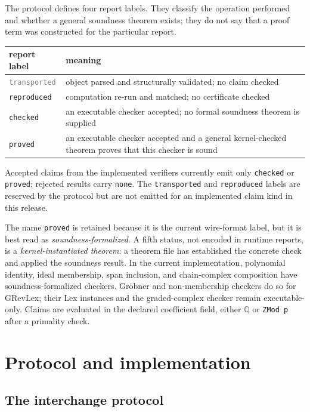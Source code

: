 \documentclass[11pt]{article}
\newcommand{\proved}{\textcolor{okgreen}{\code{proved}}}
\newcommand{\checked}{\textcolor{warnamber}{\code{checked}}}
\newcommand{\QQ}{\mathbb{Q}}
\newcommand{\code}[1]{\texttt{#1}}
\begin{document}
The protocol defines four report labels.  They classify the operation
performed and whether a general soundness theorem exists; they do not
say that a proof term was constructed for the particular report.

\begin{center}
\begin{tabular}{lp{}}
\toprule
report label & meaning \\
\midrule
\textcolor{gray}{\code{transported}} & object parsed and structurally validated; no claim checked \\
\textcolor{gray!30!black}{\code{reproduced}} & computation re-run and matched; no certificate checked \\
\checked{} & an executable checker accepted; no formal soundness theorem is supplied \\
\proved{} & an executable checker accepted and a general kernel-checked theorem proves that this checker is sound \\
\bottomrule
\end{tabular}
\end{center}

Accepted claims from the implemented verifiers currently emit only
\checked{} or \proved{}; rejected results carry \code{none}.  The
\code{transported} and \code{reproduced} labels are
reserved by the protocol but are not emitted for an implemented claim
kind in this release.

The name \code{proved} is retained because it is the current wire-format
label, but it is best read as \emph{soundness-formalized}.  A fifth
status, not encoded in runtime reports, is a \emph{kernel-instantiated
theorem}: a theorem file has established the concrete check and applied
the soundness result.  In the current implementation, polynomial
identity, ideal membership, span inclusion, and chain-complex
composition have soundness-formalized checkers.  Gr\"obner and
non-membership checkers do so for GRevLex; their Lex instances and the
graded-complex checker remain executable-only.  Claims are evaluated in
the declared coefficient field, either $\QQ$ or \code{ZMod p} after a
primality check.

\section{Protocol and implementation}\label{sec:implementation}

\subsection{The interchange protocol}\label{sec:protocol}
\end{document}
